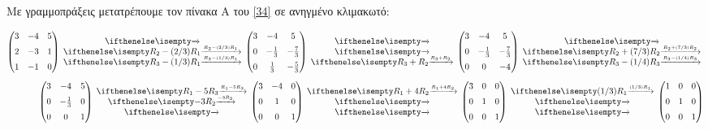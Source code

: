 \documentclass[12pt, fleqn, leqno]{extreport}
\begin{document}
Με γραμμοπράξεις μετατρέπουμε τον πίνακα A του \eqref{34} σε ανηγμένο κλιμακωτό:

\begin{equation*}
    \begin{aligned}
        \begin{pmatrix}
            3 & -4 & 5 \\[0.2cm]
            2 & -3 & 1 \\[0.2cm]
            1 & -1 & 0
        \end{pmatrix}\rowops{,R_{2}-(2/3)R_{1},R_{3}-(1/3)R_{1}}
        \begin{pmatrix}
            3 & -4           & 5            \\[0.2cm]
            0 & -\frac{1}{3} & -\frac{7}{3} \\[0.2cm]
            0 & \frac{1}{3}  & -\frac{5}{3}
        \end{pmatrix}\rowops{,,R_{3}+R_{2}}
        \begin{pmatrix}
            3 & -4           & 5            \\[0.2cm]
            0 & -\frac{1}{3} & -\frac{7}{3} \\[0.2cm]
            0 & 0            & -4
        \end{pmatrix}\rowops{,R_{2}+(7/3)R_{2},R_{3}-(1/4)R_{3}} \\[0.2cm]
        \begin{pmatrix}
            3 & -4           & 5 \\[0.2cm]
            0 & -\frac{1}{3} & 0 \\[0.2cm]
            0 & 0            & 1
        \end{pmatrix}\rowops{R_{1}-5R_{3},-3R_{2},}
        \begin{pmatrix}
            3 & -4 & 0 \\[0.2cm]
            0 & 1  & 0 \\[0.2cm]
            0 & 0  & 1
        \end{pmatrix}
        \rowops{R_{1}+4R_{2},,}
        \begin{pmatrix}
            3 & 0 & 0 \\[0.2cm]
            0 & 1 & 0 \\[0.2cm]
            0 & 0 & 1
        \end{pmatrix}
        \rowops{(1/3)R_{1},,}
        \begin{pmatrix}
            1 & 0 & 0 \\[0.2cm]
            0 & 1 & 0 \\[0.2cm]
            0 & 0 & 1
        \end{pmatrix}
    \end{aligned}
\end{equation*}
\end{document}
